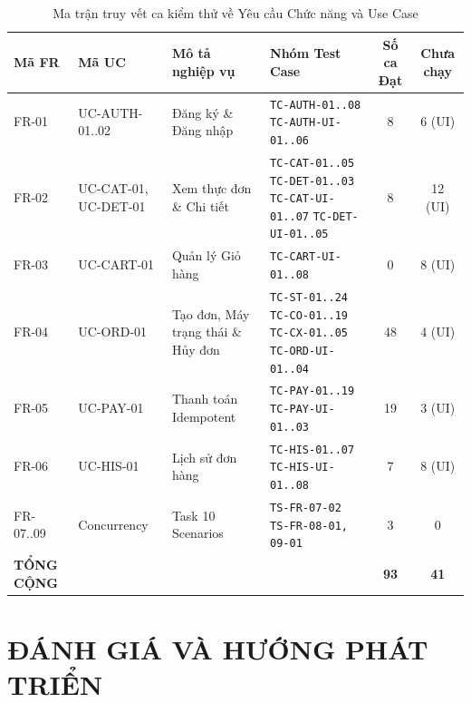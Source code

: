 \documentclass[12pt,a4paper,oneside]{report}
\begin{document}
\begin{table}[H]
\centering
\small
\caption{Ma trận truy vết ca kiểm thử về Yêu cầu Chức năng và Use Case}
\label{tab:test-traceability-summary}
\begin{tabularx}{\textwidth}{lp{2.4cm}p{3.6cm}Xcc}
\toprule
\textbf{Mã FR} & \textbf{Mã UC} & \textbf{Mô tả nghiệp vụ} & \textbf{Nhóm Test Case} & \textbf{Số ca Đạt} & \textbf{Chưa chạy} \\
\midrule
FR-01 & UC-AUTH-01..02 & Đăng ký \& Đăng nhập & \texttt{TC-AUTH-01..08} \newline \texttt{TC-AUTH-UI-01..06} & 8 & 6 (UI) \\
FR-02 & UC-CAT-01, UC-DET-01 & Xem thực đơn \& Chi tiết & \texttt{TC-CAT-01..05} \newline \texttt{TC-DET-01..03} \newline \texttt{TC-CAT-UI-01..07} \newline \texttt{TC-DET-UI-01..05} & 8 & 12 (UI) \\
FR-03 & UC-CART-01 & Quản lý Giỏ hàng & \texttt{TC-CART-UI-01..08} & 0 & 8 (UI) \\
FR-04 & UC-ORD-01 & Tạo đơn, Máy trạng thái \& Hủy đơn & \texttt{TC-ST-01..24} \newline \texttt{TC-CO-01..19} \newline \texttt{TC-CX-01..05} \newline \texttt{TC-ORD-UI-01..04} & 48 & 4 (UI) \\
FR-05 & UC-PAY-01 & Thanh toán Idempotent & \texttt{TC-PAY-01..19} \newline \texttt{TC-PAY-UI-01..03} & 19 & 3 (UI) \\
FR-06 & UC-HIS-01 & Lịch sử đơn hàng & \texttt{TC-HIS-01..07} \newline \texttt{TC-HIS-UI-01..08} & 7 & 8 (UI) \\
FR-07..09 & Concurrency & Task 10 Scenarios & \texttt{TS-FR-07-02} \newline \texttt{TS-FR-08-01, 09-01} & 3 & 0 \\
\midrule
\textbf{TỔNG CỘNG} & & & & \textbf{93} & \textbf{41} \\
\bottomrule
\end{tabularx}
\end{table}



\chapter{ĐÁNH GIÁ VÀ HƯỚNG PHÁT TRIỂN}
\label{ch:evaluation}
\end{document}
